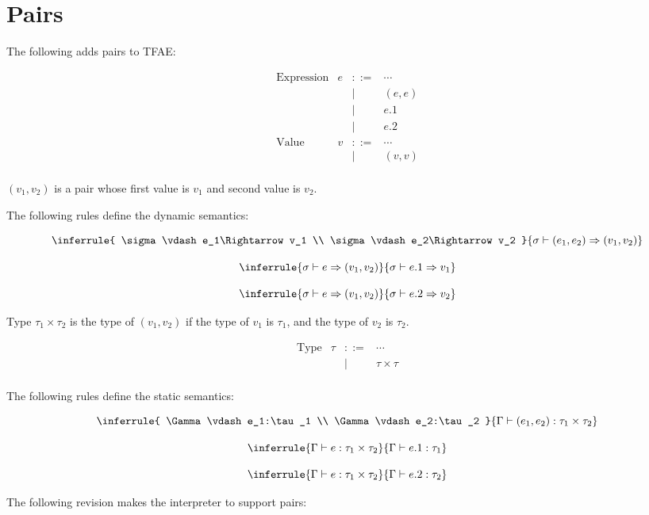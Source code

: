 \section{Pairs}

The following adds pairs to TFAE:

\[
\begin{array}{lrcl}
\text{Expression} & e & ::= & \cdots \\
&& | & (e,e) \\
&& | & e.1 \\
&& | & e.2 \\
\text{Value} & v & ::= & \cdots \\
&& | & (v,v) \\
\end{array}
\]

$(v_1,v_2)$ is a pair whose first value is $v_1$ and second value is $v_2$.

The following rules define the dynamic semantics:

\[
\inferrule
{
  \sigma\vdash e_1\Rightarrow v_1 \\
  \sigma\vdash e_2\Rightarrow v_2
}
{ \sigma\vdash (e_1,e_2)\Rightarrow (v_1,v_2) }
\]

\[
\inferrule
{
  \sigma\vdash e\Rightarrow (v_1,v_2)
}
{ \sigma\vdash e.1\Rightarrow v_1 }
\]

\[
\inferrule
{
  \sigma\vdash e\Rightarrow (v_1,v_2)
}
{ \sigma\vdash e.2\Rightarrow v_2 }
\]

Type $\tau_1\times\tau_2$ is the type of $(v_1,v_2)$ if the type of $v_1$ is
$\tau_1$, and the type of $v_2$ is $\tau_2$.

\[
\begin{array}{lrcl}
\text{Type} & \tau & ::= & \cdots \\
&& | & \tau\times\tau \\
\end{array}
\]

The following rules define the static semantics:

\[
\inferrule
{
  \Gamma\vdash e_1:\tau_1 \\
  \Gamma\vdash e_2:\tau_2
}
{ \Gamma\vdash (e_1,e_2):\tau_1\times\tau_2 }
\]

\[
\inferrule
{
  \Gamma\vdash e:\tau_1\times\tau_2
}
{ \Gamma\vdash e.1:\tau_1 }
\]

\[
\inferrule
{
  \Gamma\vdash e:\tau_1\times\tau_2
}
{ \Gamma\vdash e.2:\tau_2 }
\]

The following revision makes the interpreter to support pairs:

